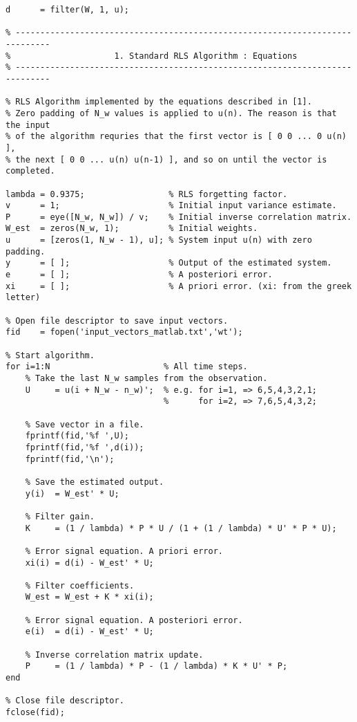 \begin{lstlisting}[style=C]
% Observed signal.
d      = filter(W, 1, u);

% -----------------------------------------------------------------------------
%                     1. Standard RLS Algorithm : Equations
% -----------------------------------------------------------------------------

% RLS Algorithm implemented by the equations described in [1].
% Zero padding of N_w values is applied to u(n). The reason is that the input
% of the algorithm requries that the first vector is [ 0 0 ... 0 u(n) ],
% the next [ 0 0 ... u(n) u(n-1) ], and so on until the vector is completed.

lambda = 0.9375;                 % RLS forgetting factor.
v      = 1;                      % Initial input variance estimate.
P      = eye([N_w, N_w]) / v;    % Initial inverse correlation matrix.
W_est  = zeros(N_w, 1);          % Initial weights.
u      = [zeros(1, N_w - 1), u]; % System input u(n) with zero padding.
y      = [ ];                    % Output of the estimated system.
e      = [ ];                    % A posteriori error.
xi     = [ ];                    % A priori error. (xi: from the greek letter)

% Open file descriptor to save input vectors.
fid    = fopen('input_vectors_matlab.txt','wt');

% Start algorithm.
for i=1:N                       % All time steps.
    % Take the last N_w samples from the observation.
    U     = u(i + N_w - n_w)';  % e.g. for i=1, => 6,5,4,3,2,1;
                                %      for i=2, => 7,6,5,4,3,2;

    % Save vector in a file.
    fprintf(fid,'%f ',U);
    fprintf(fid,'%f ',d(i));
    fprintf(fid,'\n');

    % Save the estimated output.
    y(i)  = W_est' * U;
    
    % Filter gain.
    K     = (1 / lambda) * P * U / (1 + (1 / lambda) * U' * P * U);

    % Error signal equation. A priori error.
    xi(i) = d(i) - W_est' * U;

    % Filter coefficients.
    W_est = W_est + K * xi(i);

    % Error signal equation. A posteriori error.
    e(i)  = d(i) - W_est' * U;

    % Inverse correlation matrix update.
    P     = (1 / lambda) * P - (1 / lambda) * K * U' * P;
end

% Close file descriptor.
fclose(fid);


\end{lstlisting}
